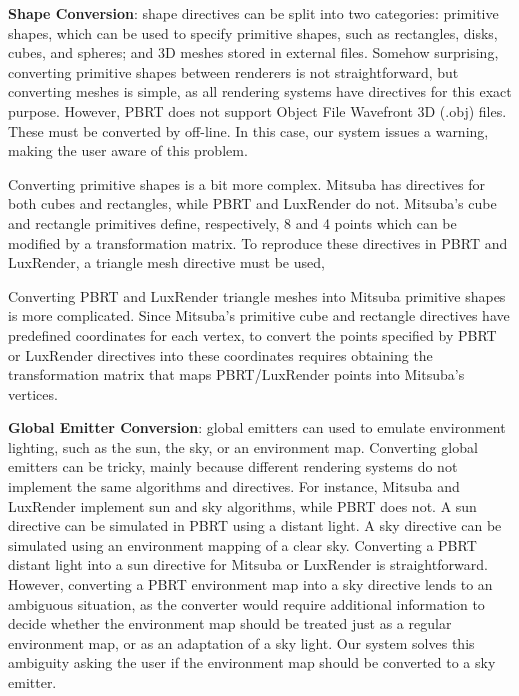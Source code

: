 \textbf{Shape Conversion}: 
shape directives can be split into two categories: primitive shapes, which can
be used to specify primitive shapes, such as rectangles, disks, cubes, and spheres;
and 3D meshes stored in external files. Somehow surprising, converting primitive shapes between renderers is not straightforward, but
converting meshes is simple, as all rendering systems have directives
for this exact purpose. However, PBRT does not support Object File Wavefront 3D
(.obj) files. These must be converted by off-line.
In this case, our system issues a warning, making the user aware of this problem.

Converting primitive shapes is a bit more complex. Mitsuba has directives for both cubes 
and rectangles, while PBRT and LuxRender do not. Mitsuba's cube and rectangle 
primitives define, respectively, 8 and 4 points which can be modified by 
a transformation matrix. To reproduce these directives in PBRT and 
LuxRender, a triangle mesh directive must be used, 

Converting PBRT and LuxRender triangle meshes into 
Mitsuba primitive shapes is more complicated. Since Mitsuba's 
primitive cube and rectangle directives have predefined coordinates for each 
vertex, to convert the points specified by PBRT or LuxRender directives into 
these coordinates requires obtaining the transformation matrix that maps PBRT/LuxRender points 
into Mitsuba's vertices. 


\textbf{Global Emitter Conversion}:
global emitters can used to emulate environment lighting, such as the sun, the
sky, or an environment map. Converting global emitters can be tricky, mainly
because different rendering systems do not implement the same algorithms and directives. 
For instance, Mitsuba and LuxRender implement sun and sky algorithms, while PBRT does not.
A sun directive can be simulated in PBRT using a distant light. A sky directive can
be simulated using an environment mapping of a clear sky.
%
Converting a PBRT distant light into
a sun directive for Mitsuba or LuxRender is straightforward. However, converting a PBRT
environment map into a sky directive lends to an ambiguous situation, as the converter would require additional information to decide 
whether the environment map should be treated just as a regular environment map, or as an adaptation of a sky light.
Our system solves this ambiguity asking the user if the environment map should be converted to a sky
emitter.

